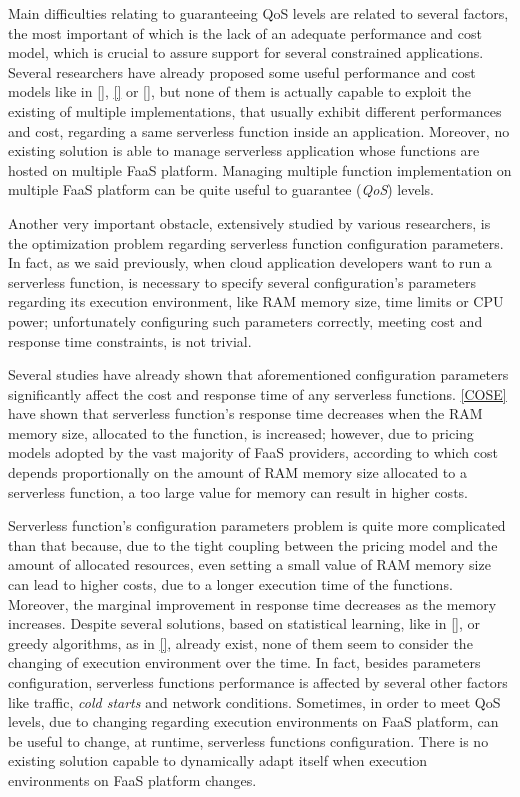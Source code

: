 \documentclass[12pt,a4paper]{report}
\begin{document}
Main difficulties relating to guaranteeing QoS levels are related to several factors, the most important of which is the lack of an adequate performance and cost model, which is crucial to assure support for several constrained applications. Several researchers have already proposed some useful performance and cost models like in \ref{}, \ref{} or \ref{}, but none of them is actually capable to exploit the existing of multiple implementations, that usually exhibit different performances and cost, regarding a same serverless function inside an application. Moreover, no existing solution is able to manage serverless application whose functions are hosted on multiple FaaS platform. Managing multiple function implementation on multiple FaaS platform can be quite useful to guarantee (\textit{QoS}) levels.

Another very important obstacle, extensively studied by various researchers, is the optimization problem regarding serverless function configuration parameters. In fact, as we said previously, when cloud application developers want to run a serverless function, is necessary to specify several configuration's parameters regarding its execution environment, like RAM memory size, time limits or CPU power; unfortunately configuring such parameters correctly, meeting cost and response time constraints, is not trivial. 

Several studies have already shown that aforementioned configuration parameters significantly affect the cost and response time of any serverless functions. \ref{COSE} have shown that serverless function's response time decreases when the RAM memory size, allocated to the function, is increased; however, due to pricing models adopted by the vast majority of FaaS providers, according to which cost depends proportionally on the amount of RAM memory size allocated to a serverless function, a too large value for memory can result in higher costs.

Serverless function's configuration parameters problem is quite more complicated than that because, due to the tight coupling between the pricing model and the amount of allocated resources, even setting a small value of RAM memory size can lead to higher costs, due to a longer execution time of the functions. Moreover, the marginal improvement in response time decreases as the memory increases. Despite several solutions, based on statistical learning, like in \ref{}, or greedy algorithms, as in \ref{}, already exist, none of them seem to consider the changing of execution environment over the time. In fact, besides parameters configuration, serverless functions performance is affected by several other factors like traffic, \textit{cold starts} and network conditions. Sometimes, in order to meet QoS levels, due to changing regarding execution environments on FaaS platform, can be useful to change, at runtime, serverless functions configuration. There is no existing solution capable to dynamically adapt itself when execution environments on FaaS platform changes.
\end{document}
